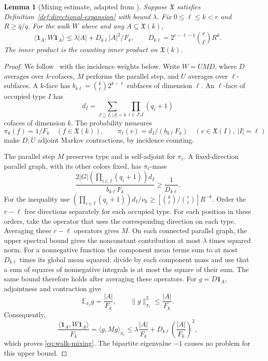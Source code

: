 \documentclass[11pt,letterpaper]{article}
\renewcommand{\le}{\leqslant}
\renewcommand{\ge}{\geqslant}
\newtheorem{lemma}[theorem]{Lemma}
\theoremstyle{definition}
\theoremstyle{remark}
\newcommand{\X}{\mathfrak{X}}
\newcommand{\one}{\mathbf 1}
\newcommand{\minus}{\setminus}
\begin{document}
\begin{lemma}[Mixing estimate,
adapted from {\cite[Lemma~6.12]{DinurLinVidick2024}}]
\label{lem:cubical-mixing}
Suppose $\X$ satisfies Definition~\ref{def:directional-expansion}
with bound $\lambda$.
Fix $0\le\ell\le k<r$ and $R\ge\overline q/\underline q$.
For the walk $W$ above and any $A\subseteq \X(k)$,
\begin{equation}
 \langle\one_A,W\one_A\rangle
 \le\lambda|A|+D_{k\ell}|A|^2/F_k,\qquad
 D_{k\ell}=2^{r-\ell-1}\binom r\ell R^k.
 \label{eq:walk-mixing}
\end{equation}
The inner product is the counting inner product on $\X(k)$.
\end{lemma}
\begin{proof}
We follow~\cite[Lemma~6.12]{DinurLinVidick2024} with the incidence
weights below. Write $W=UMD$, where $D$ averages over $k$-cofaces,
$M$ performs the parallel step, and $U$ averages over $\ell$-subfaces.
A $k$-face has
$b_{k\ell}=\binom k\ell2^{k-\ell}$ subfaces of dimension $\ell$.
An $\ell$-face of occupied type $I$ has
\[
 d_I=\sum_{J\supseteq I, |J|=k}\prod_{i\in J\minus I}(q_i+1)
\]
cofaces of dimension $k$. The probability measures
\[
 \pi_k(f)=1/F_k\quad(f\in \X(k)),\qquad
 \pi_\ell(v)=d_I/(b_{k\ell}F_k)\quad(v\in \X(I),\ |I|=\ell)
\]
make $D,U$ adjoint Markov contractions, by incidence counting.

The parallel step $M$ preserves type and is self-adjoint for
$\pi_\ell$. A fixed-direction parallel graph, with
its other colors fixed, has $\pi_\ell$-mass
\[
 \frac{2|G|(\prod_{i\in I}(q_i+1))d_I}{b_{k\ell}F_k}
 \ge\frac1{D_{k\ell}}.
\]
For the inequality use
$(\prod_{i\in I}(q_i+1))d_I/\nu_k
\ge[\binom k\ell/\binom r\ell]R^{-k}$.
Order the $r-\ell$ free directions separately for each
occupied type. For each position in these orders, take the operator
that uses the corresponding direction on each type. Averaging these
$r-\ell$ operators gives $M$.
On each connected parallel graph, the upper spectral bound gives
the nonconstant contribution at most $\lambda$ times squared norm.
For a nonnegative function the component mean terms sum to at most
$D_{k\ell}$ times its global mean squared: divide by each component
mass and use that a sum of squares of nonnegative integrals is at
most the square of their sum. The same bound therefore holds after averaging these operators.
For $g=D\one_A$, adjointness and contraction give
\[
 \mathbb E_{\pi_\ell}g=\frac{|A|}{F_k},
 \qquad
 \|g\|_{\pi_\ell}^2\le\frac{|A|}{F_k}.
\]
Consequently,
\[
 \frac{\langle\one_A,W\one_A\rangle}{F_k}
 =\langle g,Mg\rangle_{\pi_\ell}
 \le \lambda\frac{|A|}{F_k}
      +D_{k\ell}\left(\frac{|A|}{F_k}\right)^2,
\]
which proves \eqref{eq:walk-mixing}.
The
bipartite eigenvalue $-1$ causes no problem for this upper bound.

\end{proof}
\end{document}
